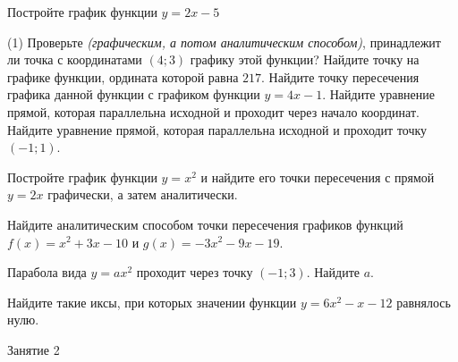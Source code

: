 %
%

\begin{class}[number=1]
	\begin{listofex}
		\item {}
		\item Постройте график функции \( y=2x-5 \)
		\begin{tasks}(1)
			\task Проверьте \textit{(графическим, а потом аналитическим способом)}, принадлежит ли точка с координатами \( (4;3) \) графику этой функции?
			\task Найдите точку на графике функции, ордината которой равна \( 217 \).
			\task Найдите точку пересечения графика данной функции с графиком функции \( y=4x-1 \).
			\task Найдите уравнение прямой, которая параллельна исходной и проходит через начало координат.
			\task Найдите уравнение прямой, которая параллельна исходной и проходит точку \( (-1;1) \).
		\end{tasks}
		\item Постройте график функции \(y=x^2\) и найдите его точки пересечения с прямой \( y=2x \) графически, а затем аналитически.
		\item Найдите аналитическим способом точки пересечения графиков функций \(f(x)=x^2+3x-10\)	и \( g(x)=-3x^2-9x-19 \).
		\item Парабола вида \( y=ax^2 \) проходит через точку \( (-1;3) \). Найдите \( a \).
		\item Найдите такие иксы, при которых значении функции \( y=6x^2-x-12 \) равнялось нулю.
	\end{listofex}
\end{class}

\begin{class}[number=2]
	\begin{listofex}
		\item Занятие 2
	\end{listofex}
\end{class}

